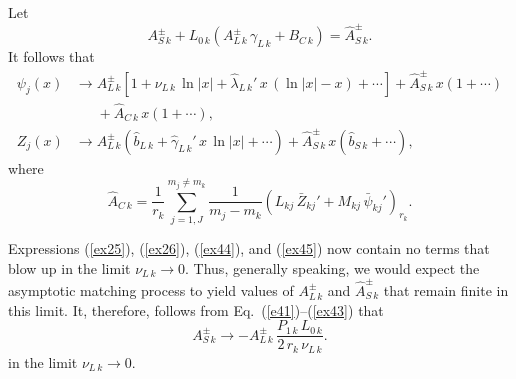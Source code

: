 \documentclass[12pt,prb,aps,notitlepage]{revtex4-1}
\begin{document}
Let
\begin{equation}\label{ex43}
A_{S\,k}^\pm + L_{0\,k}\left(A_{L\,k}^\pm\,\gamma_{L\,k}+B_{C\,k}\right)= \hat{A}_{S\,k}^\pm.
\end{equation}
It follows that
\begin{align}
\psi_j(x)&\rightarrow A_{L\,k}^{\pm}\left[1+\nu_{L\,k}\,\ln|x| + \hat{\lambda}_{L\,k}'\,x\,(\ln|x|-x)+\cdots\right]
+\hat{A}_{S\,k}^\pm\,x\left(1+\cdots\right)\nonumber\\[0.5ex]
&\phantom{\rightarrow} +\hat{A}_{C\,k}\,x\left(1+\cdots\right),\label{ex44}\\[0.5ex]
Z_j(x)&\rightarrow A_{L\,k}^\pm\left(\hat{b}_{L\,k}+\hat{\gamma}_{L\,k}'\,x\,\ln|x|+\cdots\right)
+\hat{A}_{S\,k}^{\pm}\,x\left(\hat{b}_{S\,k}+\cdots\right),\label{ex45}
\end{align}
where
\begin{equation}
\hat{A}_{C\,k}= \frac{1}{r_k}\sum_{j=1,J}^{m_j\neq m_k}
\frac{1}{m_j-m_k}\left(L_{kj}\,\bar{Z}_{kj}' + M_{kj}\,\bar{\psi}_{kj}'\right)_{r_k}.
\end{equation}

Expressions (\ref{ex25}), (\ref{ex26}),  (\ref{ex44}), and (\ref{ex45}) now contain no
terms that blow up in the limit $\nu_{L\,k}\rightarrow 0 $. Thus, generally
speaking, we would expect the asymptotic matching process to yield values of $A_{L\,k}^\pm$
and $\hat{A}_{S\,k}^\pm$ that remain finite in this limit. 
It, therefore, follows from Eq.~(\ref{e41})--(\ref{ex43})  that
\begin{equation}
A_{S\,k}^\pm \rightarrow - A_{L\,k}^\pm\,\frac{P_{1\,k}\,L_{0\,k}}{2\,r_k\,\nu_{L\,k}}.
\end{equation}
in the limit $\nu_{L\,k}\rightarrow 0$.
\end{document}
